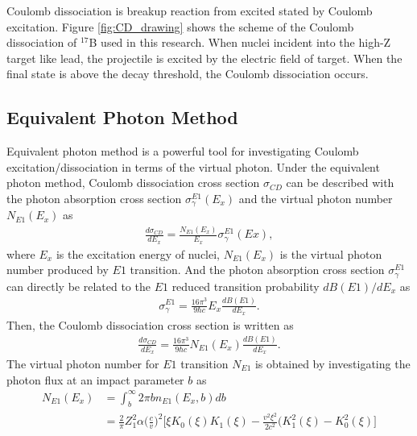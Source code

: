 Coulomb dissociation is breakup reaction from excited stated by Coulomb excitation. Figure \ref{fig:CD_drawing} shows the scheme of the Coulomb dissociation of ${}^{17}$B used in this research. When nuclei incident into the high-Z target like lead, the projectile is excited by the electric field of target. When the final state is above the decay threshold, the Coulomb dissociation occurs.

\subsection{Equivalent Photon Method}
Equivalent photon method\cite{Jackson}\cite{Bertulani}\cite{Aumann} is a powerful tool for investigating Coulomb excitation/dissociation in terms of the virtual photon. Under the equivalent photon method, Coulomb dissociation cross section $\sigma_{CD}$ can be described with the photon absorption cross section $\sigma_{\gamma}^{E1}(E_x)$ and the virtual photon number $N_{E1}(E_x)$ as
\begin{align}
    \frac{d\sigma_{CD}}{dE_x} = \frac{N_{E1}(E_x)}{E_x} \sigma_{\gamma}^{E1}(Ex),
\end{align}
where $E_x$ is the excitation energy of nuclei, $N_{E1}(E_x)$ is the virtual photon number produced by $E1$ transition. And the photon absorption cross section $\sigma_{\gamma}^{E1}$ can directly be related to the $E1$ reduced transition probability $dB(E1)/dE_x$ as
\begin{align}
    \sigma_{\gamma}^{E1} = \frac{16 \pi^3}{9 \hbar c} E_x \frac{dB(E1)}{dE_x}. \label{eq:photon_absorption}
\end{align}
Then, the Coulomb dissociation cross section is written as
\begin{align}
    \frac{d\sigma_{CD}}{dE_x} = \frac{16 \pi^3}{9 \hbar c} N_{E1}(E_x) \frac{dB(E1)}{dE_x}.
\end{align}
The virtual photon number for $E1$ transition $N_{E1}$ is obtained by investigating the photon flux at an impact parameter $b$ as
\begin{align}
    N_{E1}(E_x) &= \int_{b}^{\infty} 2\pi b n_{E1}(E_x, b) db  \\
                &=\frac{2}{\pi}Z^{2}_{1}\alpha\Big(\frac{c}{v}\Big)^{2}\Big[\xi K_{0}(\xi)K_{1}(\xi)-\frac{v^{2}\xi^{2}}{2c^{2}}(K^{2}_{1}(\xi)-K^{2}_{0}(\xi)\Big] \label{eq:Virtual_Photon}
\end{align}

